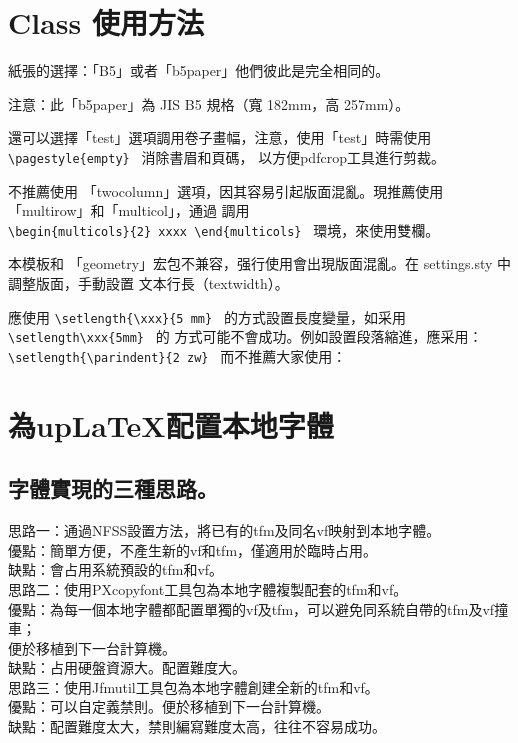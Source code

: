 \clearpage

\section{Class 使用方法}

\par%
紙張的選擇：「B5」或者「b5paper」他們彼此是完全相同的。
\par%
注意：此「b5paper」為 JIS B5 規格（寬 182mm，高 257mm）。
\par%
還可以選擇「test」選項調用卷子畫幅，注意，使用「test」時需使用 \verb+\pagestyle{empty} + 消除書眉和頁碼，
以方便pdfcrop工具進行剪裁。
\par%
不推薦使用 「twocolumn」選項，因其容易引起版面混亂。現推薦使用 「multirow」和「multicol」，通過
調用\\ {\verb+\begin{multicols}{2} xxxx \end{multicols} + } 環境，來使用雙欄。

\par%
本模板和 「geometry」宏包不兼容，强行使用會出現版面混亂。在 settings.sty 中調整版面，手動設置
文本行長（textwidth）。

\par%
應使用 \verb+\setlength{\xxx}{5 mm} + 的方式設置長度變量，如采用\verb+\setlength\xxx{5mm} + 的
方式可能不會成功。例如設置段落縮進，應采用：{\verb+ \setlength{\parindent}{2 zw} + }
而不推薦大家使用：\\
{\uwave{\color{red}\verb+ \setlength\parindent{2 zw} + }}


\section{為up{\LaTeX}配置本地字體}

\subsection{字體實現的三種思路。}
\par\noindent
思路一：通過NFSS設置方法，將已有的tfm及同名vf映射到本地字體。\\
優點：簡單方便，不產生新的vf和tfm，僅適用於臨時占用。\\
缺點：會占用系統預設的tfm和vf。\\[5mm]
思路二：使用PXcopyfont工具包為本地字體複製配套的tfm和vf。\\
優點：為每一個本地字體都配置單獨的vf及tfm，可以避免同系統自帶的tfm及vf撞車；\\
\hspace{3zw}便於移植到下一台計算機。\\
缺點：占用硬盤資源大。配置難度大。\\[5mm]
思路三：使用Jfmutil工具包為本地字體創建全新的tfm和vf。\\
優點：可以自定義禁則。便於移植到下一台計算機。\\
缺點：配置難度太大，禁則編寫難度太高，往往不容易成功。

